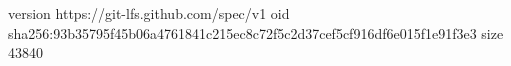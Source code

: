 version https://git-lfs.github.com/spec/v1
oid sha256:93b35795f45b06a4761841c215ec8c72f5c2d37cef5cf916df6e015f1e91f3e3
size 43840
